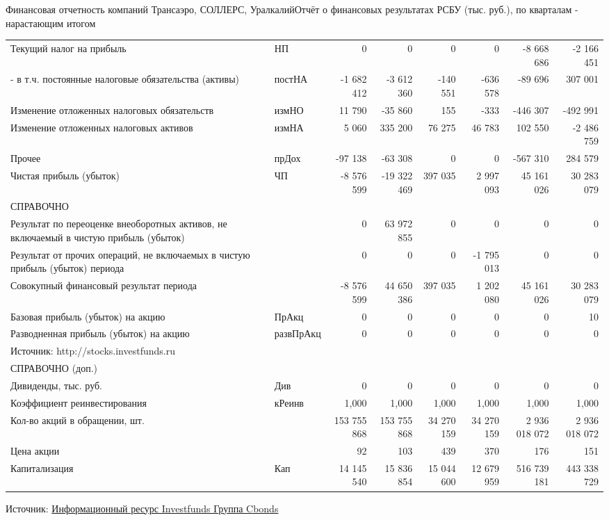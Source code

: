 \documentclass[_Banking_p2.tex]{subfiles}
\begin{document}
\begin{frame}[shrink=70]{Финансовая отчетность компаний Трансаэро, СОЛЛЕРС, Уралкалий}{Отчёт о финансовых результатах РСБУ (тыс. руб.), по кварталам - нарастающим итогом}
\begin{table}[htbp]
\begin{tabular}{L{8cm}lrrrrrr}
Текущий налог на прибыль & НП    & 0     & 0     & 0     & 0     & -8 668 686 & -2 166 451 \\
- в т.ч. постоянные налоговые обязательства (активы) & постНА & -1 682 412 & -3 612 360 & -140 551 & -636 578 & -89 696 & 307 001 \\
Изменение отложенных налоговых обязательств & измНО & 11 790 & -35 860 & 155   & -333  & -446 307 & -492 991 \\
Изменение отложенных налоговых активов & измНА & 5 060 & 335 200 & 76 275 & 46 783 & 102 550 & -2 486 759 \\
Прочее & прДох & -97 138 & -63 308 & 0     & 0     & -567 310 & 284 579 \\
Чистая прибыль (убыток) & ЧП    & -8 576 599 & -19 322 469 & 397 035 & 2 997 093 & 45 161 026 & 30 283 079 \\
СПРАВОЧНО &       & \textbf{} & \textbf{} & \textbf{} & \textbf{} & \textbf{} & \textbf{} \\
Результат по переоценке внеоборотных активов, не включаемый в чистую прибыль (убыток) &       & 0     & 63 972 855 & 0     & 0     & 0     & 0 \\
Результат от прочих операций, не включаемых в чистую прибыль (убыток) периода &       & 0     & 0     & 0     & -1 795 013 & 0     & 0 \\
Совокупный финансовый результат периода &       & -8 576 599 & 44 650 386 & 397 035 & 1 202 080 & 45 161 026 & 30 283 079 \\
Базовая прибыль (убыток) на акцию & ПрАкц & 0     & 0     & 0     & 0     & 0     & 10 \\
Разводненная прибыль (убыток) на акцию & развПрАкц & 0     & 0     & 0     & 0     & 0     & 0 \\
Источник: http://stocks.investfunds.ru &       &       &       &       &       &       &  \\
СПРАВОЧНО (доп.) &       &       &       &       &       &       &  \\
Дивиденды, тыс. руб. & Див   & 0     & 0     & 0     & 0     & 0     & 0 \\
Коэффициент реинвестирования & кРеинв & 1,000 & 1,000 & 1,000 & 1,000 & 1,000 & 1,000 \\
Кол-во акций в обращении, шт. &       & 153 755 868 & 153 755 868 & 34 270 159 & 34 270 159 & 2 936 018 072 & 2 936 018 072 \\
Цена акции &       & 92    & 103   & 439   & 370   & 176   & 151 \\
Капитализация & Кап   & 14 145 540 & 15 836 854 & 15 044 600 & 12 679 959 & 516 739 181 & 443 338 729 \\
\bottomrule
\end{tabular}%
\label{tab:addlabel}%
\end{table}%
Источник: \href{http://investfunds.ru/}{Информационный ресурс Investfunds Группа Cbonds}
\end{frame}
\end{document}
